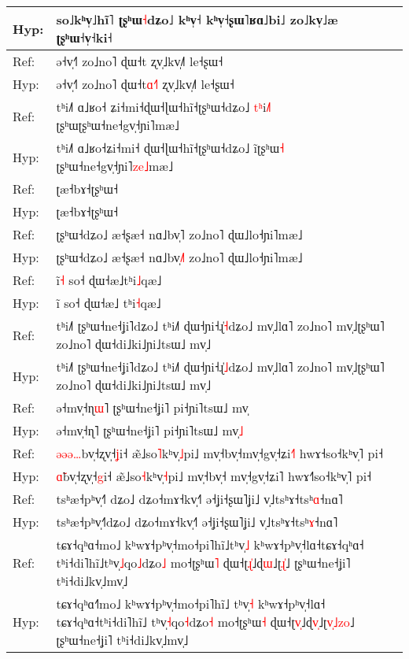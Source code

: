 \documentclass[10pt]{article}
\DeclareRobustCommand{\hl}[1]{{\textcolor{red}{#1}}}
\begin{document}
\begin{longtable}{ll}
Hyp: & so˩kʰv̩˩hĩ˥\hl{ }ʈʂʰɯ\hl{˧}dʑo˩ kʰv̩˧\hl{ }kʰv̩˧ʂɯ˥ʁɑ˩bi˩\hl{ }zo˩kv̩˩æ ʈʂʰɯ˧v̩˧ki˧ \\ 
\midrule 
Ref: & ə˧v̩˧˥ zo˩no˥ ɖɯ˧t ʐv̩˩kv̩˩˥ le˧ʂɯ˧ \\ 
Hyp: & ə˧v̩˧˥ zo˩no˥ ɖɯ˧t\hl{ɑ}\hl{˧}\hl{˥} ʐv̩˩kv̩˩˥ le˧ʂɯ˧ \\ 
\midrule 
Ref: & tʰi˩˥ ɑ˩ʁo˧\hl{ }ʑi˧mi˧ɖɯ˧ɭɯ˧hĩ˧ʈʂʰɯ˧dʑo˩ \hl{t}\hl{ʰ}i\hl{˩}\hl{˥}\hl{ }ʈʂʰɯʈʂʰɯ˧ne˧gv̩˧ɲi˥mæ˩ \\ 
Hyp: & tʰi˩˥ ɑ˩ʁo˧ʑi˧mi˧\hl{ }ɖɯ˧ɭɯ˧hĩ˧ʈʂʰɯ˧dʑo˩ i\hl{̃}ʈʂʰɯ\hl{˧}\hl{ }ʈʂʰɯ˧ne˧gv̩˧ɲi˥\hl{z}\hl{e}\hl{˩}mæ˩ \\ 
\midrule 
Ref: & ʈæ˧bɤ˧ʈʂʰɯ˧ \\ 
Hyp: & ʈæ˧bɤ˧ʈʂʰɯ˧ \\ 
\midrule 
Ref: & ʈʂʰɯ˧dʑo˩ æ˧ʂæ˧ nɑ˩bv̩˥ zo˩no˥ ɖɯ˩lo˧ɲi˥mæ˩ \\ 
Hyp: & ʈʂʰɯ˧dʑo˩ æ˧ʂæ˧ nɑ˩bv̩\hl{˩}˥ zo˩no˥ ɖɯ˩lo˧ɲi˥mæ˩ \\ 
\midrule 
Ref: & ĩ\hl{˧} so˧ ɖɯ˧æ˩tʰi\hl{˩}qæ˩ \\ 
Hyp: & ĩ so˧ ɖɯ˧æ˩\hl{ }tʰi\hl{˧}qæ˩ \\ 
\midrule 
Ref: & tʰi˩˥ ʈʂʰɯ˧ne˧ʝi˥dʑo˩ tʰi˩˥ ɖɯ˧ɲi˧ɻ̍\hl{˧}dʑo˩ mv̩˩lɑ˥ zo˩no˥ mv̩˩ʈʂʰɯ˥ zo˩no˥ ɖɯ˧di˩ki˩ɲi˩tsɯ˩ mv̩˩ \\ 
Hyp: & tʰi˩˥ ʈʂʰɯ˧ne˧ʝi˥dʑo˩ tʰi˩˥ ɖɯ˧ɲi˧ɻ̍\hl{˩}dʑo˩ mv̩˩lɑ˥ zo˩no˥ mv̩˩ʈʂʰɯ˥ zo˩no˥ ɖɯ˧di˩ki˩ɲi˩tsɯ˩ mv̩˩ \\ 
\midrule 
Ref: & ə˧mv̩˧ɳ\hl{ɯ}˥ ʈʂʰɯ˧ne˧ʝi˥ pi˧ɲi˥tsɯ˩ mv̩ \\ 
Hyp: & ə˧mv̩˧ɳ˥ ʈʂʰɯ˧ne˧ʝi˥ pi˧ɲi˥tsɯ˩ mv̩\hl{˩} \\ 
\midrule 
Ref: & \hl{ə}\hl{ə}\hl{ə}\hl{…}bv̩˧ʐv̩˧\hl{ʝ}i˧ æ̃˩so\hl{˥}kʰv̩\hl{˩}pi˩ mv̩˧bv̩˧mv̩˧gv̩˧ʑi\hl{˧}˥ hwɤ˧so˧kʰv̩˥ pi˧ \\ 
Hyp: & \hl{ɑ}\hl{̃}bv̩˧ʐv̩˧\hl{g}i˧ æ̃˩so\hl{˧}kʰv̩\hl{˧}pi˩ mv̩˧bv̩˧\hl{ }mv̩˧gv̩˧ʑi˥ hwɤ˧\hl{˥}so˧kʰv̩˥ pi˧ \\ 
\midrule 
Ref: & tsʰæ˧pʰv̩˧˥\hl{ }dʑo˩ dʑo˧mɤ˧kv̩˧˥ ə˧ʝi˧ʂɯ˥ʝi˩ v̩˩tsʰɤ˧tsʰ\hl{ɑ}˧nɑ˥ \\ 
Hyp: & tsʰæ˧pʰv̩˧˥dʑo˩ dʑo˧mɤ˧kv̩˧˥ ə˧ʝi˧ʂɯ˥ʝi˩ v̩˩tsʰɤ˧tsʰ\hl{ɤ}˧nɑ˥ \\ 
\midrule 
Ref: & tɕɤ˧qʰɑ˧mo˩ kʰwɤ˧pʰv̩˧mo˧pi˥hĩ˩tʰv̩\hl{˩} kʰwɤ˧pʰv̩˧lɑ˧tɕɤ˧qʰɑ˧\hl{ }tʰi˧di˥hĩ˩tʰv̩\hl{˩}qo\hl{˩}dʑo\hl{˩} mo˧ʈʂʰɯ\hl{˥} ɖɯ˧ʈ\hl{ɻ}\hl{̍}˩ɖ\hl{ɯ}˩ʈ\hl{ɻ}\hl{̍}˩ ʈʂʰɯ˧ne˧ʝi˥ tʰi˧di˩kv̩˩mv̩˩ \\ 
Hyp: & tɕɤ˧qʰɑ˧\hl{˥}mo˩ kʰwɤ˧pʰv̩˧mo˧pi˥hĩ˩\hl{ }tʰv̩\hl{˧} kʰwɤ˧pʰv̩˧lɑ˧\hl{ }tɕɤ˧qʰɑ˧tʰi˧di˥hĩ˩\hl{ }tʰv̩\hl{˧}qo\hl{˧}dʑo\hl{˧} mo˧ʈʂʰɯ\hl{˧} ɖɯ˧ʈ\hl{v}\hl{̩}˩ɖ\hl{v}\hl{̩}˩ʈ\hl{v}\hl{̩}\hl{˩}\hl{z}\hl{o}˩ ʈʂʰɯ˧ne˧ʝi˥ tʰi˧di˩kv̩˩mv̩˩ \\ 

\end{longtable}
\end{document}
